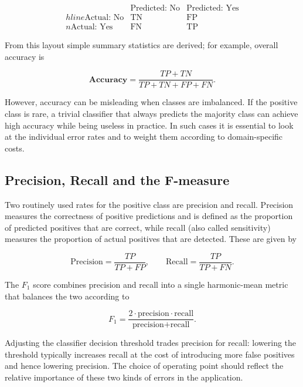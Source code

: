 \begin{equation}
\begin{array}{c|cc}
& \text{Predicted: No} & \text{Predicted: Yes} \\hline
\text{Actual: No} & \text{TN} & \text{FP} \\n\text{Actual: Yes} & \text{FN} & \text{TP} \
\end{array}
\end{equation}

From this layout simple summary statistics are derived; for example, overall accuracy is

\begin{equation}
\textbf{Accuracy} = \frac{TP + TN}{TP + TN + FP + FN}.
\end{equation}

However, accuracy can be misleading when classes are imbalanced. If the positive class is rare, a trivial classifier that always predicts the majority class can achieve high accuracy while being useless in practice. In such cases it is essential to look at the individual error rates and to weight them according to domain-specific costs.

\subsection{Precision, Recall and the F-measure}

Two routinely used rates for the positive class are precision and recall. Precision measures the correctness of positive predictions and is defined as the proportion of predicted positives that are correct, while recall (also called sensitivity) measures the proportion of actual positives that are detected. These are given by

\begin{equation}
\text{Precision} = \frac{TP}{TP + FP}, \qquad
\text{Recall} = \frac{TP}{TP + FN}.
\end{equation}

The $F_1$ score combines precision and recall into a single harmonic-mean metric that balances the two according to

\begin{equation}
F_1 = \frac{2 \cdot \text{precision} \cdot \text{recall}}{\text{precision} + \text{recall}}.
\end{equation}

Adjusting the classifier decision threshold trades precision for recall: lowering the threshold typically increases recall at the cost of introducing more false positives and hence lowering precision. The choice of operating point should reflect the relative importance of these two kinds of errors in the application.

